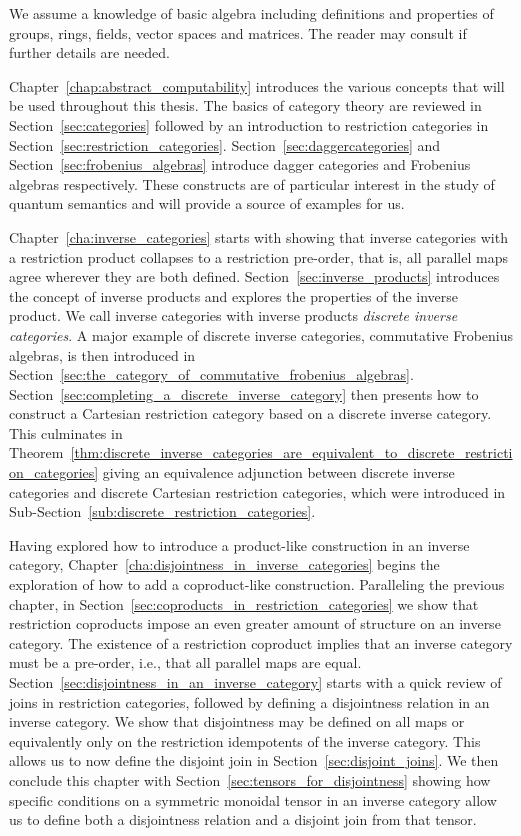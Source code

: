 We assume a knowledge of basic algebra including definitions and properties of groups, rings,
fields, vector spaces and matrices. The reader may consult \cite{lang:algebra} if further details
are needed.

Chapter~\ref{chap:abstract_computability} introduces the various concepts that will be used
throughout this thesis. The basics of category theory are reviewed in Section~\ref{sec:categories}
followed by an introduction to restriction categories in
Section~\ref{sec:restriction_categories}. Section~\ref{sec:daggercategories} and
Section~\ref{sec:frobenius_algebras}  introduce dagger categories and Frobenius
algebras respectively. These constructs are of particular interest in the study of quantum semantics
and will provide a source of examples for us.

Chapter~\ref{cha:inverse_categories} starts with showing that inverse categories with a restriction
product collapses to a restriction pre-order, that is, all parallel maps agree wherever they are
both defined. Section~\ref{sec:inverse_products} introduces the concept of inverse products and
explores the properties of the inverse product. We call inverse categories with
inverse products \emph{discrete inverse categories}. A major example of discrete inverse
categories, commutative Frobenius algebras, is then introduced in
Section~\ref{sec:the_category_of_commutative_frobenius_algebras}.
Section~\ref{sec:completing_a_discrete_inverse_category} then presents how to construct a Cartesian
restriction category based on a discrete inverse category. This culminates in
Theorem~\ref{thm:discrete_inverse_categories_are_equivalent_to_discrete_restriction_categories}
giving an equivalence adjunction between discrete inverse categories and discrete Cartesian
restriction categories, which were introduced in Sub-Section~\ref{sub:discrete_restriction_categories}.

Having explored how to introduce a product-like construction in an inverse category,
Chapter~\ref{cha:disjointness_in_inverse_categories} begins the exploration of how to add a
coproduct-like construction. Paralleling the previous chapter, in
Section~\ref{sec:coproducts_in_restriction_categories} we show that restriction coproducts
impose an even greater amount of structure on an inverse category. The existence of a restriction
coproduct implies that an inverse category must be a pre-order, i.e., that all parallel maps are
equal. Section~\ref{sec:disjointness_in_an_inverse_category} starts with a quick review of joins in
restriction categories, followed by defining a disjointness relation in an inverse category. We show
that disjointness may be defined on all maps or equivalently only on the restriction idempotents of
the inverse category. This allows us to now define the disjoint join in
Section~\ref{sec:disjoint_joins}. We then conclude this chapter with
Section~\ref{sec:tensors_for_disjointness} showing how specific conditions on a symmetric monoidal
tensor in an inverse category allow us to define both a disjointness relation and a disjoint join
from that tensor.

